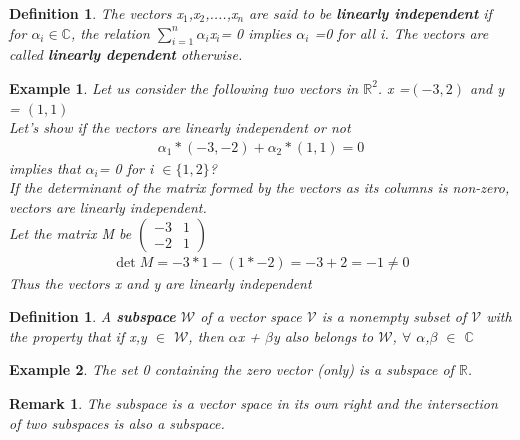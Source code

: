 \documentclass[12pt,a4paper]{article}
\newtheorem{remark}[thm]{Remark}
\newtheorem{defn}[thm]{Definition}
\newtheorem{exmp}{Example}[section]
\begin{document}
\begin{defn}
The vectors x$_{1}$,x$_{2}$,....,x$_{n}$ are said to be \textbf{linearly independent} if for $\alpha_{i} $$\in$$\mathbb{C}$, the relation $\sum_{i=1}^{n}$$ \alpha_{i}$x$_{i} $= 0 implies $\alpha_{i}$ =0 for all i. The  vectors are called \textbf{linearly dependent} otherwise. 
\end{defn}
\begin{exmp} Let us consider the following two vectors in $\mathbb{R}^2$. x =$(-3, 2)$ and y = $(1, 1)$\\
Let's show if the vectors are linearly independent or not
\begin{align*}
 \alpha_{1} * (-3, -2) + \alpha_{2} * (1, 1) = 0
\end{align*}
  implies  that $\alpha_{i}$= 0 for i $\in \{1,2\}$?\\
If the determinant of the matrix formed by the vectors as its columns is non-zero, vectors are linearly independent.\\
Let the matrix M be
$\begin{pmatrix}
-3 & 1\\
-2 & 1
\end{pmatrix}$
\\
\begin{align*}
\det M = -3 * 1 - ( 1 * -2)  = -3 + 2 = -1 \ne 0
\end{align*}
Thus the vectors x and y are linearly independent
\end{exmp}
\begin{defn}
A \textbf{subspace} $\mathcal{W}$ of a vector space $\mathcal{V}$ is a nonempty subset of $\mathcal{V}$ with the property that if x,y $\in$ $\mathcal{W}$, then $\alpha$x + $\beta$y also belongs to $\mathcal{W}$, $\forall$ $\alpha$,$\beta$ $\in$ $\mathbb{C}$
\end{defn}
\begin{exmp}
The set {0} containing the zero vector (only) is a subspace of $\mathbb{R}$.
\end{exmp}
\begin{remark}
The subspace is a vector space in its own right and the intersection of two subspaces is also a subspace.
\end{remark}
\end{document}
